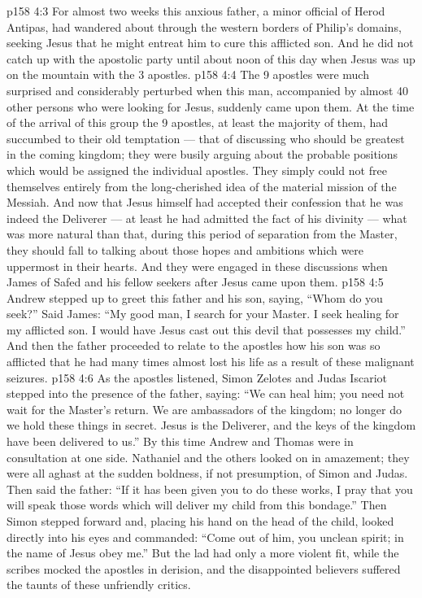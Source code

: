 \vs p158 4:3 For almost two weeks this anxious father, a minor official of Herod Antipas, had wandered about through the western borders of Philip’s domains, seeking Jesus that he might entreat him to cure this afflicted son. And he did not catch up with the apostolic party until about noon of this day when Jesus was up on the mountain with the 3 apostles.
\vs p158 4:4 The 9 apostles were much surprised and considerably perturbed when this man, accompanied by almost 40 other persons who were looking for Jesus, suddenly came upon them. At the time of the arrival of this group the 9 apostles, at least the majority of them, had succumbed to their old temptation --- that of discussing who should be greatest in the coming kingdom; they were busily arguing about the probable positions which would be assigned the individual apostles. They simply could not free themselves entirely from the long\hyp{}cherished idea of the material mission of the Messiah. And now that Jesus himself had accepted their confession that he was indeed the Deliverer --- at least he had admitted the fact of his divinity --- what was more natural than that, during this period of separation from the Master, they should fall to talking about those hopes and ambitions which were uppermost in their hearts. And they were engaged in these discussions when James of Safed and his fellow seekers after Jesus came upon them.
\vs p158 4:5 Andrew stepped up to greet this father and his son, saying, “Whom do you seek?” Said James: “My good man, I search for your Master. I seek healing for my afflicted son. I would have Jesus cast out this devil that possesses my child.” And then the father proceeded to relate to the apostles how his son was so afflicted that he had many times almost lost his life as a result of these malignant seizures.
\vs p158 4:6 As the apostles listened, Simon Zelotes and Judas Iscariot stepped into the presence of the father, saying: “We can heal him; you need not wait for the Master’s return. We are ambassadors of the kingdom; no longer do we hold these things in secret. Jesus is the Deliverer, and the keys of the kingdom have been delivered to us.” By this time Andrew and Thomas were in consultation at one side. Nathaniel and the others looked on in amazement; they were all aghast at the sudden boldness, if not presumption, of Simon and Judas. Then said the father: “If it has been given you to do these works, I pray that you will speak those words which will deliver my child from this bondage.” Then Simon stepped forward and, placing his hand on the head of the child, looked directly into his eyes and commanded: “Come out of him, you unclean spirit; in the name of Jesus obey me.” But the lad had only a more violent fit, while the scribes mocked the apostles in derision, and the disappointed believers suffered the taunts of these unfriendly critics.
